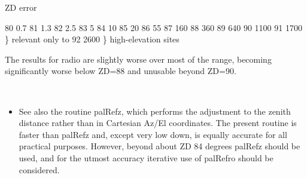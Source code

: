 \documentclass[twoside,11pt]{article}
\renewcommand{\_}{\texttt{\symbol{95}}}
\newcommand{\sstitemlist}[1]{
  \mbox{} \\
  \vspace{-3.5ex}
  \begin{itemize}
     #1
  \end{itemize}
}
\newcommand{\sstitem}{\item}
\newcommand{\sstitemlist}[1]{
      \begin{itemize}
         #1
      \end{itemize}
      \\
   }
\newcommand{\sstitem}{\item}
\begin{document}
{{{      }
               ZD    error

               80      0.7
               81      1.3
               82      2.5
               83      5
               84     10
               85     20
               86     55
               87    160
               88    360
               89    640
               90   1100
               91   1700         \} relevant only to
               92   2600         \} high-elevation sites

      The results for radio are slightly worse over most of the range,
      becoming significantly worse below ZD=88 and unusable beyond
      ZD=90.

      \sstitemlist{

         \sstitem
         See also the routine palRefz, which performs the adjustment to
         the zenith distance rather than in Cartesian Az/El coordinates.
         The present routine is faster than palRefz and, except very low down,
         is equally accurate for all practical purposes.  However, beyond
         about ZD 84 degrees palRefz should be used, and for the utmost
         accuracy iterative use of palRefro should be considered.
      }
   }
}
\end{document}
